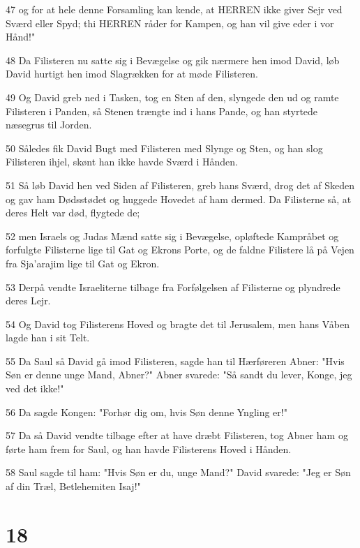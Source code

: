 \par 47 og for at hele denne Forsamling kan kende, at HERREN ikke giver Sejr ved Sværd eller Spyd; thi HERREN råder for Kampen, og han vil give eder i vor Hånd!"
\par 48 Da Filisteren nu satte sig i Bevægelse og gik nærmere hen imod David, løb David hurtigt hen imod Slagrækken for at møde Filisteren.
\par 49 Og David greb ned i Tasken, tog en Sten af den, slyngede den ud og ramte Filisteren i Panden, så Stenen trængte ind i hans Pande, og han styrtede næsegrus til Jorden.
\par 50 Således fik David Bugt med Filisteren med Slynge og Sten, og han slog Filisteren ihjel, skønt han ikke havde Sværd i Hånden.
\par 51 Så løb David hen ved Siden af Filisteren, greb hans Sværd, drog det af Skeden og gav ham Dødsstødet og huggede Hovedet af ham dermed. Da Filisterne så, at deres Helt var død, flygtede de;
\par 52 men Israels og Judas Mænd satte sig i Bevægelse, opløftede Kampråbet og forfulgte Filisterne lige til Gat og Ekrons Porte, og de faldne Filistere lå på Vejen fra Sja'arajim lige til Gat og Ekron.
\par 53 Derpå vendte Israeliterne tilbage fra Forfølgelsen af Filisterne og plyndrede deres Lejr.
\par 54 Og David tog Filisterens Hoved og bragte det til Jerusalem, men hans Våben lagde han i sit Telt.
\par 55 Da Saul så David gå imod Filisteren, sagde han til Hærføreren Abner: "Hvis Søn er denne unge Mand, Abner?" Abner svarede: "Så sandt du lever, Konge, jeg ved det ikke!"
\par 56 Da sagde Kongen: "Forhør dig om, hvis Søn denne Yngling er!"
\par 57 Da så David vendte tilbage efter at have dræbt Filisteren, tog Abner ham og førte ham frem for Saul, og han havde Filisterens Hoved i Hånden.
\par 58 Saul sagde til ham: "Hvis Søn er du, unge Mand?" David svarede: "Jeg er Søn af din Træl, Betlehemiten Isaj!"

\chapter{18}

